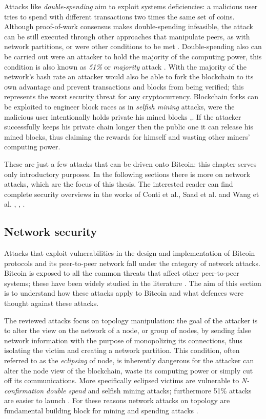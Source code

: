 \documentclass[12pt, letterpaper, twoside]{article}
\begin{document}
Attacks like \textit{double-spending} aim to exploit systems deficiencies: a malicious user tries to spend with different transactions two times the same set of coins. Although proof-of-work consensus makes double-spending infeasible, the attack can be still executed through other approaches that manipulate peers, as with network partitions, or were other conditions to be met \cite{doublespendfastpay}. Double-spending also can be carried out were an attacker to hold the majority of the computing power, this condition is also known as \textit{51\%} or \textit{majority} attack \cite{51atk}. With the majority of the network's hash rate an attacker would also be able to fork the blockchain to its own advantage and prevent transactions and blocks from being verified; this represents the worst security threat for any cryptocurrency. Blockchain forks can be exploited to engineer block races as in \textit{selfish mining} attacks, were the malicious user intentionally holds private his mined blocks \cite{selfishmining},\cite{leelavimolsilp2018selfish}. If the attacker successfully keeps his private chain longer then the public one it can release his mined blocks, thus claiming the rewards for himself and wasting other miners' computing power.

These are just a few attacks that can be driven onto Bitcoin: this chapter serves only introductory purposes. In the following sections there is more on network attacks, which are the focus of this thesis. The interested reader can find complete security overviews in the works of Conti et al., Saad et al. and Wang et al. \cite{completeattacksurvey}, \cite{saad2019attacksurface}, \cite{secpermissionlessblock}.

\subsection{Network security}\label{netsec}
Attacks that exploit vulnerabilities in the design and implementation of Bitcoin protocols and its peer-to-peer network fall under the category of network attacks. Bitcoin is exposed to all the common threats that affect other peer-to-peer systems; these have been widely studied in the literature \cite{toucedafakeboot}. The aim of this section is to understand how these attacks apply to Bitcoin and what defences were thought against these attacks.

The reviewed attacks focus on topology manipulation: the goal of the attacker is to alter the view on the network of a node, or group of nodes, by sending false network information with the purpose of monopolizing its connections, thus isolating the victim and creating a network partition. This condition, often referred to as the \textit{eclipsing} of node, is inherently dangerous for the attacker can alter the node view of the blockchain, waste its computing power or simply cut off its communications.  More specifically eclipsed victims are vulnerable to \textit{N-confirmation double spend} and selfish mining attacks; furthermore 51\% attacks are easier to launch \cite{eclipseatk}. For these reasons network attacks on topology are fundamental building block for mining and spending attacks \cite{dotan2020surveychallenges}.
\end{document}

